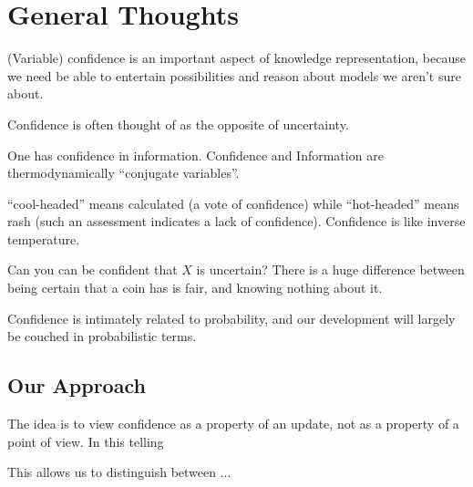 \documentclass{article}
\begin{document}
\section{General Thoughts}
(Variable) confidence is an important aspect of knowledge representation, because we need be able to entertain possibilities and reason about models we aren't sure about.

Confidence is often thought of as the opposite of uncertainty.


One has confidence in information.
Confidence and Information are thermodynamically ``conjugate variables''.


``cool-headed'' means calculated (a vote of confidence) while ``hot-headed'' means rash (such an assessment indicates a lack of confidence). Confidence is like inverse temperature.

Can you can be confident that $X$ is uncertain?
There is a huge difference between being certain that a coin has is fair, and knowing nothing about it.



Confidence is intimately related to probability, and our development will largely be couched in probabilistic terms.



\subsection*{Our Approach}
The idea is to view confidence as a property of an update, not as a property of a point of view.
In this telling

This allows us to distinguish between ...
% 

% 
% 
\end{document}
